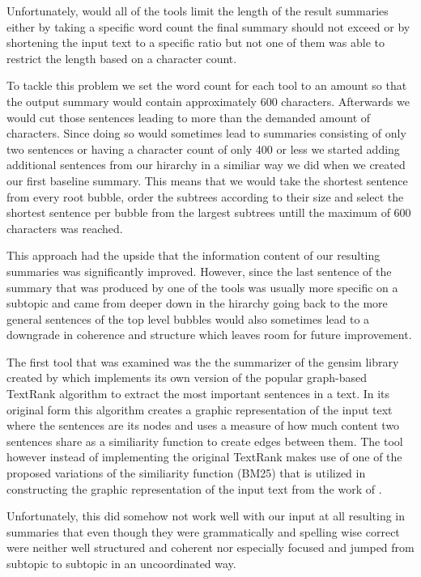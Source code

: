 Unfortunately, would all of the tools limit the length of the result summaries either by taking a specific word count the final summary should not exceed or by shortening the input text to a specific ratio but not one of them was able to restrict the length based on a character count. 

To tackle this problem we set the word count for each tool to an amount so that the output summary would contain approximately 600 characters. Afterwards we would cut those sentences leading to more than the demanded amount of characters. Since doing so would sometimes lead to summaries consisting of only two sentences or having a character count of only 400 or less we started adding additional sentences from our hirarchy in a similiar way we did when we created our first baseline summary. This means that we would take the shortest sentence from every root bubble, order the subtrees according to their size and select the shortest sentence per bubble from the largest subtrees untill the maximum of 600 characters was reached.

This approach had the upside that the information content of our resulting summaries was significantly improved. However, since the last sentence of the summary that was produced by one of the tools was usually more specific on a subtopic and came from deeper down in the hirarchy going back to the more general sentences of the top level bubbles would also sometimes lead to a downgrade in coherence and structure which leaves room for future improvement.  

The first tool that was examined was the the summarizer of the gensim library created by \citet{rehurek_lrec} which implements its own version of the popular graph-based TextRank algorithm to extract the most important sentences in a text. In its original form this algorithm creates a graphic representation of the input text where the sentences are its nodes and uses a measure of how much content two sentences share as a similiarity function to create edges between them. The tool however instead of implementing the original TextRank makes use of one of the proposed variations of the similiarity function (BM25) that is utilized in constructing the graphic representation of the input text from the work of \citet{DBLP:journals/corr/BarriosLAW16}. 

Unfortunately, this did somehow not work well with our input at all resulting in summaries that even though they were grammatically and spelling wise correct were neither well structured and coherent nor especially focused and jumped from subtopic to subtopic in an uncoordinated way.  


